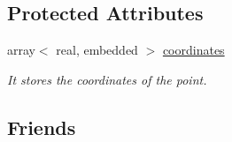 \subsection*{\-Protected \-Attributes}
\begin{DoxyCompactItemize}
\item 
\hypertarget{class_point_a24b16f288c9f98da13e4719b6ed462e6}{array$<$ real, embedded $>$ \hyperlink{class_point_a24b16f288c9f98da13e4719b6ed462e6}{coordinates}}\label{class_point_a24b16f288c9f98da13e4719b6ed462e6}

\begin{DoxyCompactList}\small\item\em \-It stores the coordinates of the point. \end{DoxyCompactList}\end{DoxyCompactItemize}
\subsection*{\-Friends}
